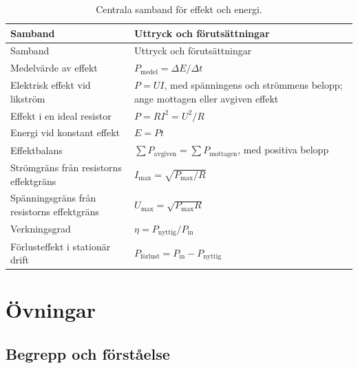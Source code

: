 \documentclass[
  swedish,
  11pt,
  a4paper,
  DIV=11,
  numbers=noendperiod,
  twoside,
  open=any]{scrreprt}
\begin{document}
\begin{longtable}[]{@{}
  >{\raggedright\arraybackslash}p{}
  >{\raggedright\arraybackslash}p{}@{}}
\caption{Centrala samband för effekt och
energi.}\label{tbl-effekt-energi-samband}\tabularnewline
\toprule\noalign{}
\begin{minipage}[b]{\linewidth}\raggedright
Samband
\end{minipage} & \begin{minipage}[b]{\linewidth}\raggedright
Uttryck och förutsättningar
\end{minipage} \\
\midrule\noalign{}
\endfirsthead
\toprule\noalign{}
\begin{minipage}[b]{\linewidth}\raggedright
Samband
\end{minipage} & \begin{minipage}[b]{\linewidth}\raggedright
Uttryck och förutsättningar
\end{minipage} \\
\midrule\noalign{}
\endhead
\bottomrule\noalign{}
\endlastfoot
Medelvärde av effekt & \(P_\mathrm{medel} = \Delta E/\Delta t\) \\
Elektrisk effekt vid likström & \(P = UI\), med spänningens och
strömmens belopp; ange mottagen eller avgiven effekt \\
Effekt i en ideal resistor & \(P = RI^2 = U^2/R\) \\
Energi vid konstant effekt & \(E = Pt\) \\
Effektbalans & \(\sum P_\mathrm{avgiven} = \sum P_\mathrm{mottagen}\),
med positiva belopp \\
Strömgräns från resistorns effektgräns &
\(I_\mathrm{max} = \sqrt{P_\mathrm{max}/R}\) \\
Spänningsgräns från resistorns effektgräns &
\(U_\mathrm{max} = \sqrt{P_\mathrm{max}R}\) \\
Verkningsgrad & \(\eta = P_\mathrm{nyttig}/P_\mathrm{in}\) \\
Förlusteffekt i stationär drift &
\(P_\mathrm{förlust} = P_\mathrm{in} - P_\mathrm{nyttig}\) \\
\end{longtable}

\section{Övningar}\label{sec-effekt-ovningar}

\subsection{Begrepp och
förståelse}\label{sec-effekt-begrepp-och-forstaelse}
\end{document}
